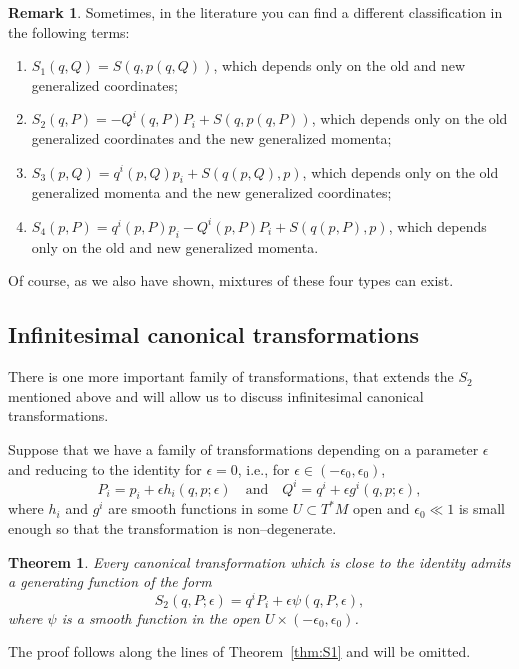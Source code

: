 \documentclass[english,fontsize=11pt,paper=b5]{scrbook}
\numberwithin{equation}{chapter}
\newtheorem{theorem}{Theorem}[chapter]
\theoremstyle{definition}
\newtheorem{remark}{Remark}[chapter]
\begin{document}
    \begin{remark}
      Sometimes, in the literature you can find a different classification in the following terms:
      \begin{enumerate}
        \item $S_1(q,Q) = S(q,p(q,Q))$, which depends only on the old and new generalized coordinates;
        \item $S_2(q,P) = - Q^i(q,P) P_i + S(q,p(q,P))$, which depends only on the old generalized coordinates and the new generalized momenta;
        \item $S_3(p,Q) = q^i(p,Q) p_i + S(q(p,Q),p)$, which depends only on the old generalized momenta and the new generalized coordinates;
        \item $S_4(p,P) = q^i(p,P) p_i - Q^i(p,P) P_i + S(q(p,P),p)$, which depends only on the old and new generalized momenta.
      \end{enumerate}
      Of course, as we also have shown, mixtures of these four types can exist.
    \end{remark}

    \subsection{Infinitesimal canonical transformations}

    There is one more important family of transformations, that extends the $S_2$ mentioned above and will allow us to discuss infinitesimal canonical transformations.

    Suppose that we have a family of transformations depending on a parameter $\epsilon$ and reducing to the identity for $\epsilon = 0$, i.e., for $\epsilon \in (-\epsilon_0, \epsilon_0)$,
    \begin{equation}\label{eq:infcantraf}
      P_i = p_i + \epsilon h_i(q,p;\epsilon) \quad\mbox{and}\quad
      Q^i = q^i + \epsilon g^i(q,p; \epsilon),
    \end{equation}
    where $h_i$ and $g^i$ are smooth functions in some $U\subset T^*M$ open and $\epsilon_0 \ll 1$ is small enough so that the transformation is non--degenerate.

    \begin{theorem}
      Every canonical transformation which is close to the identity admits a generating function of the form
      \begin{equation}\label{eq:infS2}
        S_2(q, P; \epsilon) = q^i P_i + \epsilon \psi(q,P,\epsilon),
      \end{equation}
      where $\psi$ is a smooth function in the open $U\times(-\epsilon_0,\epsilon_0)$.
    \end{theorem}
    The proof follows along the lines of Theorem~\ref{thm:S1} and will be omitted.
\end{document}
